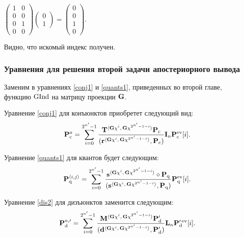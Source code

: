 \begin{math}
\begin{pmatrix}
1 & 0 \\ 0 & 0 \\ 0 & 1\\ 0 & 0
\end{pmatrix}
\begin{pmatrix} 0 \\ 1 \end{pmatrix} 
= \begin{pmatrix} 0\\ 0 \\  1 \\ 0 \end{pmatrix}.
\end{math}

Видно, что искомый индекс получен.

\subsubsection{Уравнения для решения второй задачи апостериорного вывода}


Заменим в уравнениях \ref{conj1} и \ref{quants1}, приведенных во второй главе, функцию $\mathrm{GInd}$ на матрицу проекции $\mathbf{G}$. 

Уравнение \ref{conj1} для конъюнктов приобретет следующий вид:
\begin{equation} \label{conjG}
    \mathbf{P}_\mathrm{c}^a=\sum_{i=0}^{2^{n^\prime}-1}\dfrac{\mathbf{T}^{\langle \mathbf{G}\chi^{i} ,\,\mathbf{G}\chi^{2^{n^\prime}-1-i} \rangle }\mathbf{P}_\mathrm{c}}{(\mathbf{r}^{\langle  \mathbf{G}\chi^{i},\,\mathbf{G}\chi^{2^{n^\prime}-1-i} \rangle},\mathbf{P}_\mathrm{c})}\mathbf{I}_n\mathbf{P}_\mathrm{c}^{\mathrm{ev}}[i].
\end{equation} 

Уравнение \ref{quants1} для квантов будет следующим:
\begin{equation} \label{quantsG}
 \mathbf{P}_\mathrm{q}^{\langle i, j \rangle}=\sum_{i=0}^{2^{n^\prime}-1}\dfrac{{\mathbf{s}^{\langle \mathbf{G}\chi^{i} ,\, \mathbf{G}\chi^{2^{n^\prime}-1-i}\rangle }}\circ \mathbf{P}_\mathrm{q}}{(\mathbf{s}^{\langle\mathbf{G} \chi^{i} ,\, \mathbf{G}\chi^{2^{n^\prime}-1-i}\rangle},\mathbf{P}_\mathrm{q})}\mathbf{P}_\mathrm{q}^{\mathrm{ev}}[i].
\end{equation}

Уравнение \ref{dis2} для дизъюнктов заменится следующим:
\begin{equation}\label{dis3}
 \mathbf{P}_\mathrm{d}^{a, \prime} =\sum_{i=0}^{2^{n^\prime}-1}\dfrac{\mathbf{M}^{\langle  \mathbf{G}\chi^{i},\,\mathbf{G}\chi^{2^{n^\prime}-1-i} \rangle  }\mathbf{P}_\mathrm{d}^{\prime}}{(\mathbf{d}^{\langle \mathbf{G}\chi^{i} ,\, \mathbf{G}\chi^{2^{n^\prime}-1-i}\rangle },\mathbf{P}_\mathrm{d}^{\prime})}\mathbf{L}_n\mathbf{P}_\mathrm{d}^{\prime \, \mathrm{ev}}[i].
\end{equation}